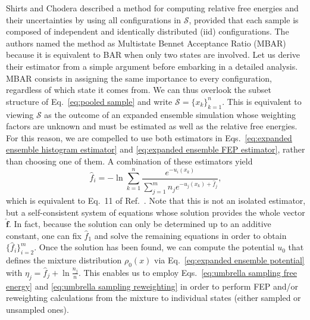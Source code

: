\documentclass[aip,jcp,reprint,amsmath,amssymb]{revtex4-1}
\newcommand{\vt}[1]{\boldsymbol{\mathbf{#1}}}           %
\begin{document}
Shirts and Chodera\cite{Shirts_2008} described a method for computing relative free energies and their uncertainties by using all configurations in $\mathcal S$, provided that each sample is composed of independent and identically distributed (iid) configurations. The authors named the method as Multistate Bennet Acceptance Ratio (MBAR) because it is equivalent to BAR when only two states are involved. Let us derive their estimator from a simple argument before embarking in a detailed analysis. MBAR consists in assigning the same importance to every configuration, regardless of which state it comes from. We can thus overlook the subset structure of Eq.~\eqref{eq:pooled sample} and write $\mathcal S = \{x_k\}_{k=1}^n$. This is equivalent to viewing $\mathcal S$ as the outcome of an expanded ensemble simulation whose weighting factors are unknown and must be estimated as well as the relative free energies. For this reason, we are compelled to use both estimators in Eqs.~\eqref{eq:expanded ensemble histogram estimator} and \eqref{eq:expanded ensemble FEP estimator}, rather than choosing one of them. A combination of these estimators yield
\begin{equation}
\label{eq:mbar free energy estimator}
\hat f_i = -\ln \sum_{k=1}^n \frac{e^{-u_i(x_k)}}{\sum_{j=1}^m n_j e^{-u_j(x_k) + \hat f_j}},
\end{equation}
which is equivalent to Eq.~11 of Ref.~. Note that this is not an isolated estimator, but a self-consistent system of equations whose solution provides the whole vector $\hat {\vt f}$. In fact, because the solution can only be determined up to an additive constant, one can fix $\hat f_1$ and solve the remaining equations in order to obtain $\{\hat f_i\}_{i=2}^m$. Once the solution has been found, we can compute the potential $u_0$ that defines the mixture distribution $\rho_0(x)$ via Eq.~\eqref{eq:expanded ensemble potential} with $\eta_j = \hat f_j + \ln \frac{n_j}{n}$. This enables us to employ Eqs.~\eqref{eq:umbrella sampling free energy} and \eqref{eq:umbrella sampling reweighting} in order to perform FEP and/or reweighting calculations from the mixture to individual states (either sampled or unsampled ones).\cite{Geyer_1994, Shirts_2017}
\end{document}
